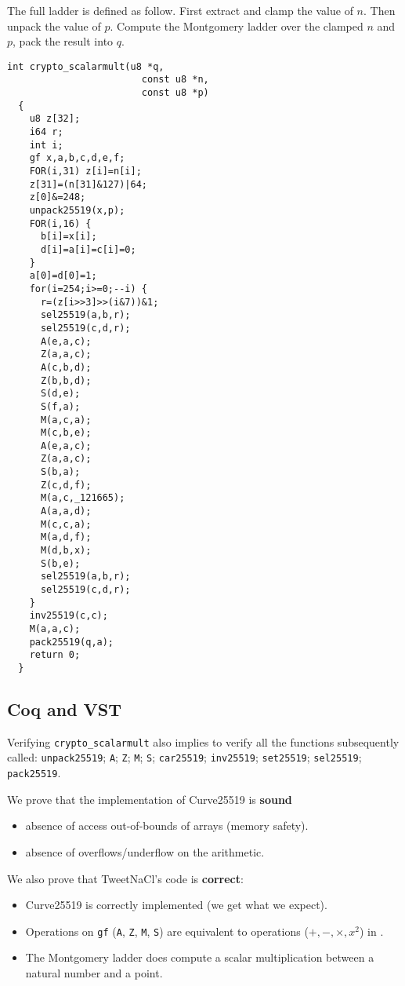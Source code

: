    The full ladder is defined as follow.
  First extract and clamp the value of $n$. Then unpack the value of $p$.
  Compute the Montgomery ladder over the clamped $n$ and $p$, pack the result into $q$.
  \begin{lstlisting}[language=Ctweetnacl]
  int crypto_scalarmult(u8 *q,
                        const u8 *n,
                        const u8 *p)
  {
    u8 z[32];
    i64 r;
    int i;
    gf x,a,b,c,d,e,f;
    FOR(i,31) z[i]=n[i];
    z[31]=(n[31]&127)|64;
    z[0]&=248;
    unpack25519(x,p);
    FOR(i,16) {
      b[i]=x[i];
      d[i]=a[i]=c[i]=0;
    }
    a[0]=d[0]=1;
    for(i=254;i>=0;--i) {
      r=(z[i>>3]>>(i&7))&1;
      sel25519(a,b,r);
      sel25519(c,d,r);
      A(e,a,c);
      Z(a,a,c);
      A(c,b,d);
      Z(b,b,d);
      S(d,e);
      S(f,a);
      M(a,c,a);
      M(c,b,e);
      A(e,a,c);
      Z(a,a,c);
      S(b,a);
      Z(c,d,f);
      M(a,c,_121665);
      A(a,a,d);
      M(c,c,a);
      M(a,d,f);
      M(d,b,x);
      S(b,e);
      sel25519(a,b,r);
      sel25519(c,d,r);
    }
    inv25519(c,c);
    M(a,a,c);
    pack25519(q,a);
    return 0;
  }
  \end{lstlisting}

\subsection{Coq and VST}



Verifying \texttt{crypto\_scalarmult} also implies to verify all the functions
subsequently called: \texttt{unpack25519}; \texttt{A}; \texttt{Z}; \texttt{M};
\texttt{S}; \texttt{car25519}; \texttt{inv25519}; \texttt{set25519}; \texttt{sel25519};
\texttt{pack25519}.

We prove that the implementation of Curve25519 is \textbf{sound} \ie
\begin{itemize}
\item absence of access out-of-bounds of arrays (memory safety).
\item absence of overflows/underflow on the arithmetic.
\end{itemize}
We also prove that TweetNaCl's code is \textbf{correct}:
\begin{itemize}
\item Curve25519 is correctly implemented (we get what we expect).
\item Operations on \texttt{gf} (\texttt{A}, \texttt{Z}, \texttt{M}, \texttt{S})
are equivalent to operations ($+,-,\times,x^2$) in \Zfield.
\item The Montgomery ladder does compute a scalar multiplication between a natural number and a point.
\end{itemize}

